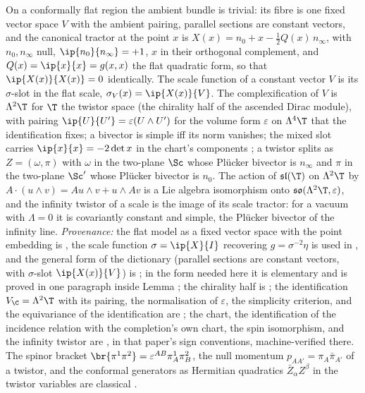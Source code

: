 On a conformally flat region the ambient bundle is trivial: its fibre is one fixed vector space $V$ with the ambient pairing, parallel sections are constant vectors, and the canonical tractor at the point $x$ is $X(x) = n_{0} + x - \tfrac12 Q(x)\, n_{\infty}$, with $n_{0}, n_{\infty}$ null, $\ip{n_{0}}{n_{\infty}} = +1$, $x$ in their orthogonal complement, and $Q(x) = \ip{x}{x} = g(x,x)$ the flat quadratic form, so that $\ip{X(x)}{X(x)} = 0$ identically. The scale function of a constant vector $V$ is its $\sigma$-slot in the flat scale, $\sigma_{V}(x) = \ip{X(x)}{V}$. The complexification of $V$ is $\Lambda^{2}\T$ for $\T$ the twistor space (the chirality half of the ascended Dirac module), with pairing $\ip{U}{U'} = \varepsilon(U \wedge U')$ for the volume form $\varepsilon$ on $\Lambda^{4}\T$ that the identification fixes; a bivector is simple iff its norm vanishes; the mixed slot carries $\ip{x}{x} = -2\det x$ in the chart's components \cite[Thm.~4.2(2)]{ButlerT9}; a twistor splits as $Z = (\omega, \pi)$ with $\omega$ in the two-plane $\Sc$ whose Pl\"ucker bivector is $n_{\infty}$ and $\pi$ in the two-plane $\Sc'$ whose Pl\"ucker bivector is $n_{0}$. The action of $\mathfrak{sl}(\T)$ on $\Lambda^{2}\T$ by $A\cdot(u \wedge v) = Au \wedge v + u \wedge Av$ is a Lie algebra isomorphism onto $\mathfrak{so}(\Lambda^{2}\T, \varepsilon)$, and the infinity twistor of a scale is the image of its scale tractor: for a vacuum with $\Lambda = 0$ it is covariantly constant and simple, the Pl\"ucker bivector of the infinity line. \emph{Provenance:} the flat model as a fixed vector space with the point embedding is \cite[\S4.2]{ButlerT6}, the scale function $\sigma = \ip{X}{I}$ recovering $g = \sigma^{-2}\eta$ is used in \cite[Lem.~4.8]{ButlerT6}, and the general form of the dictionary (parallel sections are constant vectors, with $\sigma$-slot $\ip{X(x)}{V}$) is \cite[\S2]{BEG1994}; in the form needed here it is elementary and is proved in one paragraph inside Lemma ; the chirality half is \cite[Thm.~3.1]{ButlerT9}; the identification $V_{\C} = \Lambda^{2}\T$ with its pairing, the normalisation of $\varepsilon$, the simplicity criterion, and the equivariance of the identification are \cite[Thm.~3.4]{ButlerT9}; the chart, the identification of the incidence relation with the completion's own chart, the spin isomorphism, and the infinity twistor are \cite[Thm.~4.2, Cor.~4.8, Prop.~5.2]{ButlerT9}, in that paper's sign conventions, machine-verified there. The spinor bracket $\br{\pi^{1}\pi^{2}} = \varepsilon^{AB}\pi^{1}_{A}\pi^{2}_{B}$, the null momentum $p_{AA'} = \pi_{A}\bar\pi_{A'}$ of a twistor, and the conformal generators as Hermitian quadratics $\bar{Z}_{\alpha}Z^{\beta}$ in the twistor variables are classical \cite{PenroseRindler1986, Hughston1979}.
